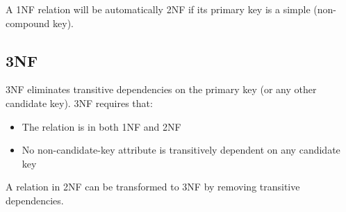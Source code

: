 A 1NF relation will be automatically 2NF if its primary key is a simple
(non-compound key).

\subsection{3NF}\label{nf-2}

3NF eliminates transitive dependencies on the primary key (or any other candidate key).
3NF requires that:

\begin{itemize}
\item
  The relation is in both 1NF and 2NF
\item
  No non-candidate-key attribute is transitively dependent on any
  candidate key
\end{itemize}

A relation in 2NF can be transformed to 3NF by removing transitive
dependencies.

